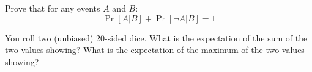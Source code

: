 \documentclass[11pt]{article}
\begin{document}
    \newpage
    
    \begin{tcolorbox}[title={Problem 3C (Probability, C.2-4)}]
        Prove that for any events $A$ and $B$:
        \[ \Pr[A|B] + \Pr[\neg A |B] =1\]
    \end{tcolorbox}
    
    \newpage
    
    \begin{tcolorbox}[title={Problem 3D (Discrete Random Variables, C.3-1)}]
        You roll two (unbiased) 20-sided dice. What is the expectation of the sum of the two values showing? What is the expectation of the maximum of the two values showing?
    \end{tcolorbox}

    
    
\end{document}
